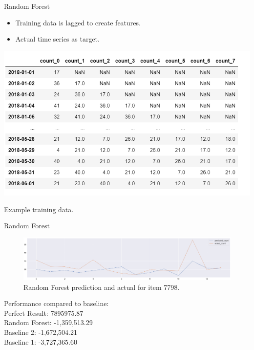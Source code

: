 \documentclass[10pt, xcolor=dvipsnames]{beamer}
\begin{document}
\begin{frame}{Random Forest}
\begin{itemize}
\item Training data is lagged to create features. 
\item Actual time series as target.
\end{itemize}
\begin{table}
\includegraphics[width=.9\textwidth]{randomforestdata.png}
\caption{Example training data.}
\end{table}

\end{frame}

\begin{frame}{Random Forest}
\begin{figure}
\includegraphics[width=\textwidth]{rf.png}
\caption{Random Forest prediction and actual for item 7798.}
\end{figure}
\alert{Performance compared to baseline:}\\[2px]
Perfect Result: 7895975.87\\
Random Forest: -1,359,513.29\\
Baseline 2: -1,672,504.21\\
Baseline 1: -3,727,365.60\\

\end{frame}
\end{document}
